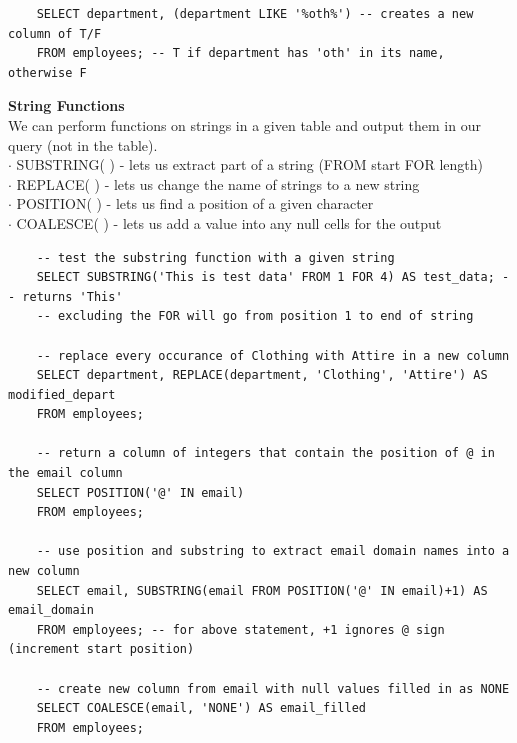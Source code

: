 \documentclass[11pt, a4paper]{article}
\begin{document}
\begin{spacing}{1.1}
\begin{lstlisting}
	SELECT department, (department LIKE '%oth%') -- creates a new column of T/F
	FROM employees; -- T if department has 'oth' in its name, otherwise F \end{lstlisting} \newpage
	\noindent \large \textbf{String Functions} \normalsize \vspace*{2mm} \\
	We can perform functions on strings in a given table and output them in our query (not in the table). \\
	\hspace*{3mm} $\cdot$ SUBSTRING( ) - lets us extract part of a string (FROM start FOR length) \\
	\hspace*{3mm} $\cdot$ REPLACE( ) - lets us change the name of strings to a new string \\
	\hspace*{3mm} $\cdot$ POSITION( ) - lets us find a position of a given character \\
	\hspace*{3mm} $\cdot$ COALESCE( ) - lets us add a value into any null cells for the output
	\begin{lstlisting}
	-- test the substring function with a given string
	SELECT SUBSTRING('This is test data' FROM 1 FOR 4) AS test_data; -- returns 'This'
	-- excluding the FOR will go from position 1 to end of string
	
	-- replace every occurance of Clothing with Attire in a new column
	SELECT department, REPLACE(department, 'Clothing', 'Attire') AS modified_depart
	FROM employees;
	
	-- return a column of integers that contain the position of @ in the email column
	SELECT POSITION('@' IN email)
	FROM employees;
	
	-- use position and substring to extract email domain names into a new column
	SELECT email, SUBSTRING(email FROM POSITION('@' IN email)+1) AS email_domain
	FROM employees; -- for above statement, +1 ignores @ sign (increment start position) 
	
	-- create new column from email with null values filled in as NONE 
	SELECT COALESCE(email, 'NONE') AS email_filled
	FROM employees; \end{lstlisting} \vspace*{2mm}
	

\end{spacing}
\end{document}
